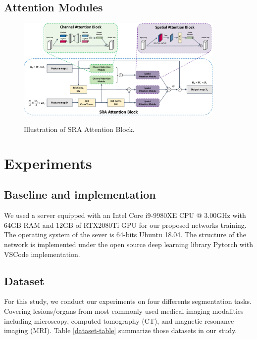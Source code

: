 \documentclass{ieeeaccess}
\begin{document}
\subsection{Attention Modules}
\begin{figure}[htbp]
    \xdef\xfigwd{\textwidth}%
    \centering
    \includegraphics[width=0.9\textwidth]{figure/Attention.pdf}
    \label{fig:overview}
    \caption{Illustration of SRA Attention Block.}
\end{figure}
\section{Experiments}
\subsection{Baseline and implementation}
We used a server equipped with an Intel Core i9-9980XE CPU @ 3.00GHz with 64GB RAM and 12GB of RTX2080Ti GPU for
our proposed networks training. The operating system of the sever is 64-bits Ubuntu 18.04. The structure of the network 
is implemented under the open source deep learning library Pytorch with VSCode implementation.

\subsection{Dataset}
For this study, we conduct our experiments on four differents segmentation tasks. 
Covering lesions/organs from most commonly used medical imaging modalities including microscopy, 
computed tomography (CT), and magnetic resonance imaging (MRI).  Table \ref{dataset-table} summarize those datasets in our study.
\end{document}
